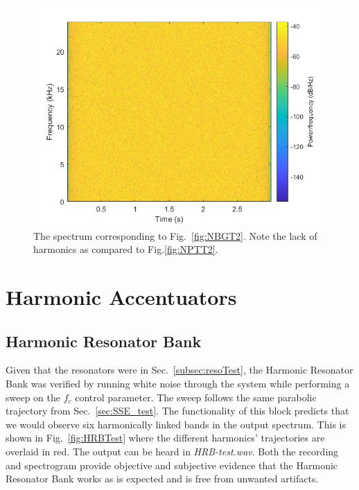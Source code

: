 \documentclass[../main.tex]{subfiles}
\begin{document}
\begin{figure}[hb]
    \centering
    \includegraphics[scale=.65]{./images/plots/NBGTest2Spectrum.png}
    \caption{The spectrum corresponding to Fig.~\ref{fig:NBGT2}. Note the lack of harmonics as compared to Fig.\ref{fig:NPTT2}.}
    \label{fig:NBGT2Spec}
\end{figure}

\clearpage

\section{Harmonic Accentuators}
\subsection{Harmonic Resonator Bank}
Given that the resonators were in Sec.~\ref{subsec:resoTest}, the Harmonic Resonator Bank was verified by running white noise through the system while performing a sweep on the $f_c$ control parameter. The sweep follows the same parabolic trajectory from Sec.~\ref{sec:SSE_test}. The functionality of this block predicts that we would observe six harmonically linked bands in the output spectrum. This is shown in Fig.~\ref{fig:HRBTest} where the different harmonics' trajectories are overlaid in red. The output can be heard in \emph{HRB-test.wav}. Both the recording and spectrogram provide objective and subjective evidence that the Harmonic Resonator Bank works as is expected and is free from unwanted artifacts.
\end{document}
